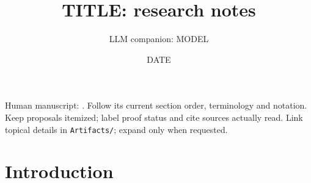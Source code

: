 \documentclass[10pt,a4paper]{amsart}
\begin{document}
\title{{{TITLE}}: research notes}
\author{LLM companion: {{MODEL}}}
\date{{{DATE}}}
\maketitle
Human manuscript: \texttt{}.
Follow its current section order, terminology and notation.
Keep proposals itemized; label proof status and cite sources actually read.
Link topical details in \texttt{Artifacts/}; expand only when requested.
\section{Introduction}\label{sec:intro}
\end{document}
